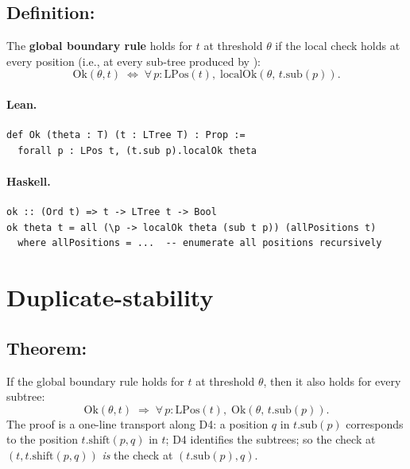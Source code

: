 \documentclass[11pt,a4paper]{article}
\begin{document}
\subsection{Definition: }

\begin{defn}
The \textbf{global boundary rule} holds for $t$ at threshold $\theta$ if the
local check holds at every position (i.e., at every sub-tree produced by
):
\[
  \mathrm{Ok}(\theta, t) \;\iff\;
  \forall\, p : \mathrm{LPos}(t),\;
  \mathrm{localOk}(\theta,\, t.\mathrm{sub}(p)).
\]
\end{defn}

\paragraph{Lean.}
\begin{lstlisting}[style=lean]
def Ok (theta : T) (t : LTree T) : Prop :=
  forall p : LPos t, (t.sub p).localOk theta
\end{lstlisting}

\paragraph{Haskell.}
\begin{lstlisting}[style=haskell]
ok :: (Ord t) => t -> LTree t -> Bool
ok theta t = all (\p -> localOk theta (sub t p)) (allPositions t)
  where allPositions = ...  -- enumerate all positions recursively
\end{lstlisting}

\section{Duplicate-stability}

\subsection{Theorem: }

\begin{thm}
If the global boundary rule holds for $t$ at threshold $\theta$, then it
also holds for every subtree:
\[
  \mathrm{Ok}(\theta, t) \;\Rightarrow\;
  \forall\, p : \mathrm{LPos}(t),\;
  \mathrm{Ok}(\theta,\, t.\mathrm{sub}(p)).
\]
The proof is a one-line transport along D4: a position $q$ in
$t.\mathrm{sub}(p)$ corresponds to the position $t.\mathrm{shift}(p, q)$ in
$t$; D4 identifies the subtrees; so the check at $(t, t.\mathrm{shift}(p,
q))$ \emph{is} the check at $(t.\mathrm{sub}(p), q)$.
\end{thm}
\end{document}
